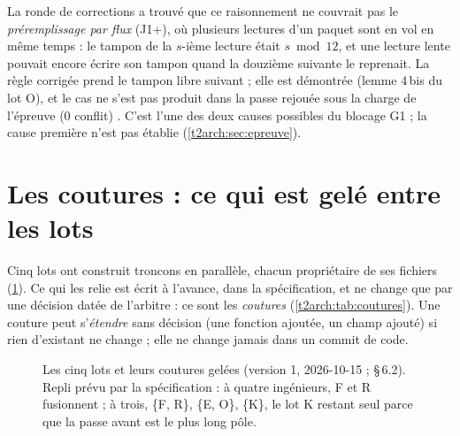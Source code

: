 La ronde de corrections a trouvé que ce raisonnement ne couvrait pas le \emph{préremplissage par flux} (J1+), où plusieurs lectures d'un paquet sont en vol en même temps : le tampon de la $s$-ième lecture était $s \bmod 12$, et une lecture lente pouvait encore écrire son tampon quand la douzième suivante le reprenait. La règle corrigée prend le tampon libre suivant ; elle est démontrée (lemme 4\,bis du lot O), et le cas ne s'est pas produit dans la passe rejouée sous la charge de l'épreuve (0 conflit) \mes. C'est l'une des deux causes possibles du blocage G1 ; la cause première n'est pas établie (\cref{t2arch:sec:epreuve}).

\section{Les coutures : ce qui est gelé entre les lots}\label{t2arch:sec:coutures}

Cinq lots ont construit troncons en parallèle, chacun propriétaire de ses fichiers (\cref{t2arch:fig:lots}). Ce qui les relie est écrit à l'avance, dans la spécification, et ne change que par une décision datée de l'arbitre : ce sont les \emph{coutures} (\cref{t2arch:tab:coutures}). Une couture peut s'\emph{étendre} sans décision (une fonction ajoutée, un champ ajouté) si rien d'existant ne change ; elle ne change jamais dans un commit de code.

\begin{figure}[ht]
\centering
\TdArchLots
\caption[Les cinq lots et leurs coutures]{Les cinq lots et leurs coutures gelées (version 1, 2026-10-15 ;  §\,6.2). Repli prévu par la spécification : à quatre ingénieurs, F et R fusionnent ; à trois, \{F, R\}, \{E, O\}, \{K\}, le lot K restant seul parce que la passe avant est le plus long pôle.}
\label{t2arch:fig:lots}
\end{figure}

